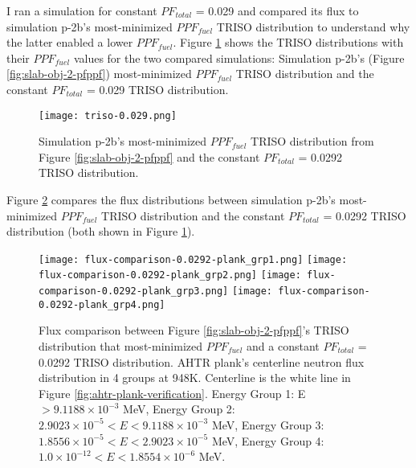 I ran a simulation for constant $PF_{total}$ = 0.029 and compared its 
flux to simulation p-2b's most-minimized $PPF_{fuel}$ TRISO distribution to understand 
why the latter enabled a lower $PPF_{fuel}$. 
Figure \ref{fig:triso-0.0292} shows the TRISO distributions with 
their $PPF_{fuel}$ values for the two compared 
simulations: Simulation p-2b's (Figure \ref{fig:slab-obj-2-pfppf}) most-minimized 
$PPF_{fuel}$ TRISO distribution and the constant $PF_{total}$ = 0.029 TRISO distribution.
\begin{figure}[htbp!]
    \centering
    \texttt{[image: triso-0.029.png]} 
    \caption{Simulation p-2b's most-minimized $PPF_{fuel}$ TRISO distribution 
    from Figure \ref{fig:slab-obj-2-pfppf} and the constant $PF_{total}$ = 0.0292
    TRISO distribution.}
    \label{fig:triso-0.0292}
\end{figure}

Figure \ref{fig:flux-comparison-0.0292-plank} compares the flux distributions between 
simulation p-2b's most-minimized $PPF_{fuel}$ TRISO distribution and the
constant $PF_{total}$ = 0.0292 TRISO distribution (both shown in Figure 
\ref{fig:triso-0.0292}).
\begin{figure}[htbp!]
    \centering
    \texttt{[image: flux-comparison-0.0292-plank\_grp1.png]} 
    \texttt{[image: flux-comparison-0.0292-plank\_grp2.png]} 
    \texttt{[image: flux-comparison-0.0292-plank\_grp3.png]} 
    \texttt{[image: flux-comparison-0.0292-plank\_grp4.png]} 
    \caption{Flux comparison between Figure \ref{fig:slab-obj-2-pfppf}'s TRISO 
    distribution that most-minimized $PPF_{fuel}$ and a constant $PF_{total}$ = 0.0292 
    TRISO distribution. 
    \gls{AHTR} plank's centerline neutron flux distribution in 4 groups at 948K. 
    Centerline is the white line in Figure \ref{fig:ahtr-plank-verification}.
    Energy Group 1: E $> 9.1188 \times 10^{-3}$ MeV, 
    Energy Group 2: $2.9023 \times 10^{-5} < E < 9.1188 \times 10^{-3}$ MeV,
    Energy Group 3:  $1.8556 \times 10^{-5} < E < 2.9023 \times 10^{-5}$ MeV,
    Energy Group 4:  $1.0 \times 10^{-12} < E < 1.8554 \times 10^{-6}$ MeV.}
    \label{fig:flux-comparison-0.0292-plank}
\end{figure}

